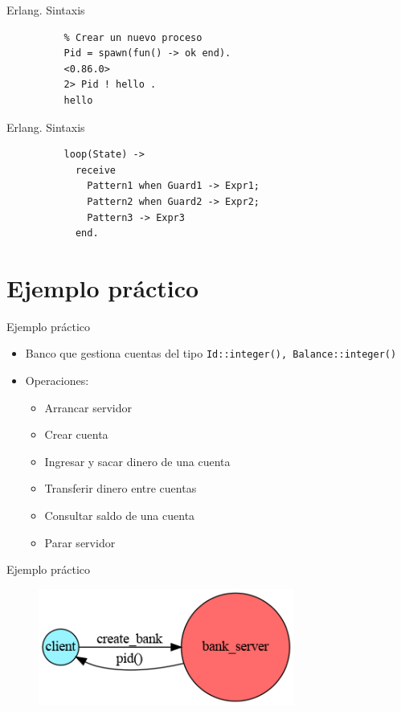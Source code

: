 \documentclass{beamer}
\begin{document}
      \begin{frame}[fragile]{Erlang. Sintaxis}
        \begin{verbatim}
          % Crear un nuevo proceso
          Pid = spawn(fun() -> ok end).
          <0.86.0>
          2> Pid ! hello .
          hello
        \end{verbatim}
      \end{frame}

      \begin{frame}[fragile]{Erlang. Sintaxis}
        \begin{verbatim}
          loop(State) ->
            receive
              Pattern1 when Guard1 -> Expr1;
              Pattern2 when Guard2 -> Expr2;
              Pattern3 -> Expr3
            end.
        \end{verbatim}
      \end{frame}

  \section{Ejemplo práctico}
    \begin{frame}{Ejemplo práctico}
      \begin{itemize}
        \item Banco que gestiona cuentas del tipo \texttt{{Id::integer(), Balance::integer()}}
        \item Operaciones:
        \begin{itemize}
          \item Arrancar servidor
          \item Crear cuenta
          \item Ingresar y sacar dinero de una cuenta
          \item Transferir dinero entre cuentas
          \item Consultar saldo de una cuenta
          \item Parar servidor
        \end{itemize}
      \end{itemize}
    \end{frame}

    \begin{frame}{Ejemplo práctico}
      \begin{figure}
        \includegraphics[width=0.75\textwidth]{1_create_bank.dot.png}
      \end{figure}
    \end{frame}
\end{document}
